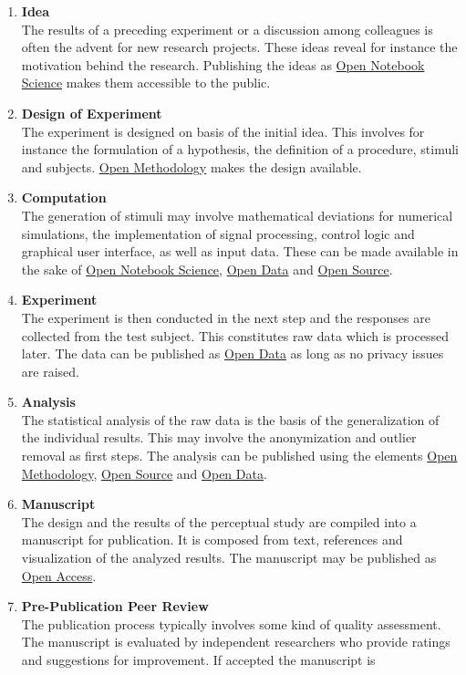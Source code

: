 \documentclass[a4paper, 10pt, twocolumn]{article}
\begin{document}
\begin{enumerate}
\item \textbf{Idea}\\
The results of a preceding experiment or a discussion among colleagues is often the advent 
for new research projects. These ideas reveal for instance the motivation behind the research. 
Publishing the ideas as \underline{Open Notebook Science} makes them accessible to the public.
%
\item \textbf{Design of Experiment}\\
The experiment is designed on basis of the initial idea. This involves for instance the formulation 
of a hypothesis, the definition of a procedure, stimuli and subjects. \underline{Open Methodology} makes
the design available.
%
\item\textbf{Computation}\\
The generation of stimuli may involve mathematical deviations for numerical simulations, the 
implementation of signal processing, control logic and graphical user interface, as well as input data. These
can be made available in the sake of \underline{Open Notebook Science}, \underline{Open Data} and \underline{Open Source}.
%
\item \textbf{Experiment}\\
The experiment is then conducted in the next step and the responses are collected from the test subject. This
constitutes raw data which is processed later. The data can be published as \underline{Open Data} as long as
no privacy issues are raised.
%
\item \textbf{Analysis}\\
The statistical analysis of the raw data is the basis of the generalization of the individual results. This may
involve the anonymization and outlier removal as first steps. The analysis can be published using the elements
\underline{Open Methodology}, \underline{Open Source} and \underline{Open Data}.
%
\item \textbf{Manuscript}\\
The design and the results of the perceptual study are compiled into a manuscript for publication. It is composed
from text, references and visualization of the analyzed results. The manuscript may be published as \underline{Open Access}.
%
\item \textbf{Pre-Publication Peer Review}\\
The publication process typically involves some kind of quality assessment. The manuscript is evaluated by
independent researchers who provide ratings and suggestions for improvement. If accepted the manuscript is

\end{enumerate}
\end{document}
